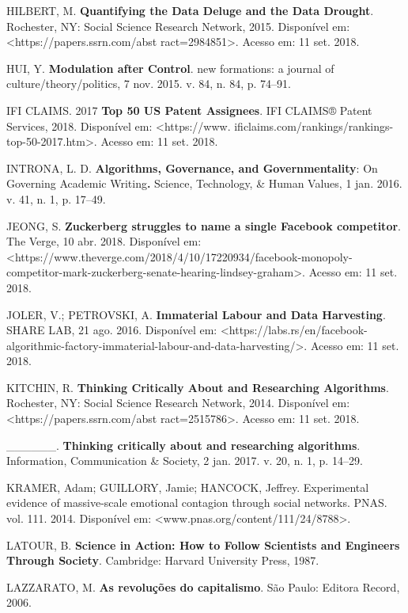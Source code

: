 HILBERT, M. \textbf{Quantifying the Data Deluge and the Data Drought}.
Rochester, NY: Social Science Research Network, 2015. Disponível em:
\textless{}https://papers.ssrn.com/abst
ract=2984851\textgreater{}.
Acesso em: 11 set. 2018.

HUI, Y. \textbf{Modulation after Control}. new formations: a journal of
culture/theory/politics, 7 nov. 2015. v. 84, n. 84, p. 74--91.

IFI CLAIMS. 2017 \textbf{Top 50 US Patent Assignees}. IFI CLAIMS® Patent
Services, 2018. Disponível em:
\textless{}https://www.
ificlaims.com/rankings/rankings-top-50-2017.htm\textgreater{}.
Acesso em: 11 set. 2018.

INTRONA, L. D. \textbf{Algorithms, Governance, and Governmentality}: On
Governing Academic Writing\textbf{.} Science, Technology, \& Human
Values, 1 jan. 2016. v. 41, n. 1, p. 17--49.

JEONG, S. \textbf{Zuckerberg struggles to name a single Facebook
competitor}. The Verge, 10 abr. 2018. Disponível em:
\textless{}https://www.theverge.com/2018/4/10/17220934/facebook-monopoly-competitor-mark-zuckerberg-senate-hearing-lindsey-graham\textgreater{}.
Acesso em: 11 set. 2018.

JOLER, V.; PETROVSKI, A. \textbf{Immaterial Labour and Data Harvesting}.
SHARE LAB, 21 ago. 2016. Disponível em:
\textless{}https://labs.rs/en/facebook-algorithmic-factory-immaterial-labour-and-data-harvesting/\textgreater{}.
Acesso em: 11 set. 2018.

KITCHIN, R. \textbf{Thinking Critically About and Researching
Algorithms}. Rochester, NY: Social Science Research Network, 2014.
Disponível em:
\textless{}https://papers.ssrn.com/abst
ract=2515786\textgreater{}.
Acesso em: 11 set. 2018.

\_\_\_\_\_\_. \textbf{Thinking critically about and researching
algorithms}. Information, Communication \& Society, 2 jan. 2017. v. 20,
n. 1, p. 14--29.

KRAMER, Adam; GUILLORY, Jamie; HANCOCK, Jeffrey. Experimental evidence
of massive-scale emotional contagion through social networks. PNAS. vol.
111. 2014. Disponível em:
\textless{}www.pnas.org/content/111/24/8788\textgreater{}.

LATOUR, B. \textbf{Science in Action: How to Follow Scientists and
Engineers Through Society}. Cambridge: Harvard University Press, 1987.

LAZZARATO, M. \textbf{As revoluções do capitalismo}. São Paulo: Editora
Record, 2006.

